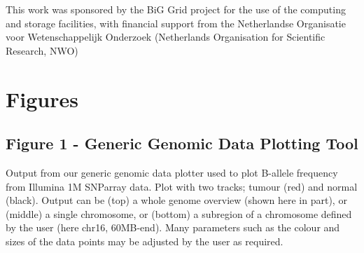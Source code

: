 \documentclass[10pt]{bmc_article}
\newenvironment{bmcformat}{\begin{raggedright}\baselineskip20pt\sloppy\setboolean{publ}{false}}{\end{raggedright}\baselineskip20pt\sloppy}
\begin{document}
\begin{bmcformat}
This work was sponsored by the BiG Grid project for the use of the computing and storage facilities, with financial support from the Netherlandse Organisatie voor Wetenschappelijk Onderzoek (Netherlands Organisation for Scientific Research, NWO)


 


{
  }     %





\section*{Figures}
  \subsection*{Figure 1 - Generic Genomic Data Plotting Tool}
      Output from our generic genomic data plotter used to plot B-allele frequency from Illumina 1M SNParray data. Plot with two tracks; tumour (red) and normal (black). Output can be (top) a whole genome overview (shown here in part), or (middle) a single chromosome, or (bottom) a subregion of a chromosome defined by the user (here chr16, 60MB-end).  Many parameters such as the colour and sizes of the data points may be adjusted by the user as required.


\end{bmcformat}
\end{document}
